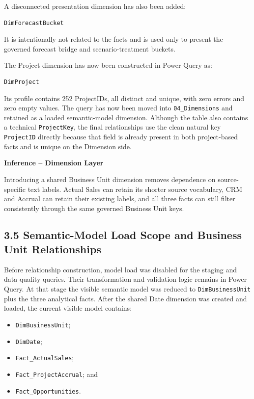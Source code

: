 \documentclass[11pt,a4paper]{article}
\begin{document}
A disconnected presentation dimension has also been added:

\begin{lstlisting}[style=powerquery]
DimForecastBucket
\end{lstlisting}

It is intentionally not related to the facts and is used only to present the
governed forecast bridge and scenario-treatment buckets.

The Project dimension has now been constructed in Power Query as:

\begin{lstlisting}[style=powerquery]
DimProject
\end{lstlisting}

Its profile contains 252 ProjectIDs, all distinct and unique, with zero
errors and zero empty values. The query has now been moved into
\texttt{04\_Dimensions} and retained as a loaded semantic-model dimension.
Although the table also contains a technical \texttt{ProjectKey}, the final
relationships use the clean natural key \texttt{ProjectID} directly because that
field is already present in both project-based facts and is unique on the
Dimension side.

\begin{inferencebox}

\textbf{Inference -- Dimension Layer}

Introducing a shared Business Unit dimension removes dependence on source-
specific text labels. Actual Sales can retain its shorter source vocabulary,
CRM and Accrual can retain their existing labels, and all three facts can still
filter consistently through the same governed Business Unit keys.

\end{inferencebox}

\subsection{3.5 Semantic-Model Load Scope and Business Unit Relationships}

Before relationship construction, model load was disabled for the staging and
data-quality queries. Their transformation and validation logic remains in
Power Query. At that stage the visible semantic model was reduced to
\texttt{DimBusinessUnit} plus the three analytical facts. After the shared Date
dimension was created and loaded, the current visible model contains:

\begin{itemize}[leftmargin=7mm,itemsep=2pt]
    \item \texttt{DimBusinessUnit};
    \item \texttt{DimDate};
    \item \texttt{Fact\_ActualSales};
    \item \texttt{Fact\_ProjectAccrual}; and
    \item \texttt{Fact\_Opportunities}.
\end{itemize}
\end{document}
